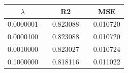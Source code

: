  \begin{center}
 \label{tab:Realdata_Ridge_lambda_R2_MSE}
 \begin{tabularx}{\textwidth}{c X c X c  }
     \hline
     \hline
$\lambda$    &&R2     &&MSE     \\
         \hline
0.0000001 && 0.823088 && 0.010720 \\
0.0000100 && 0.823088 && 0.010720 \\
0.0010000 && 0.823027 && 0.010724 \\
0.1000000 && 0.818116 && 0.011022 \\
 \end{tabularx}
 \end{center}






